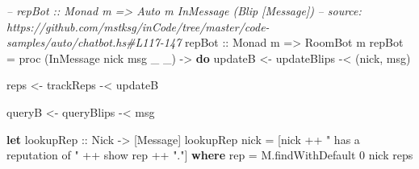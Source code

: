 \documentclass[]{article}
\newenvironment{Shaded}{\begin{snugshade}}{\end{snugshade}}
\newcommand{\CommentTok}[1]{\textcolor[rgb]{0.56,0.35,0.01}{\textit{#1}}}
\newcommand{\DataTypeTok}[1]{\textcolor[rgb]{0.13,0.29,0.53}{#1}}
\newcommand{\DecValTok}[1]{\textcolor[rgb]{0.00,0.00,0.81}{#1}}
\newcommand{\FunctionTok}[1]{\textcolor[rgb]{0.00,0.00,0.00}{#1}}
\newcommand{\KeywordTok}[1]{\textcolor[rgb]{0.13,0.29,0.53}{\textbf{#1}}}
\newcommand{\NormalTok}[1]{#1}
\newcommand{\OtherTok}[1]{\textcolor[rgb]{0.56,0.35,0.01}{#1}}
\newcommand{\StringTok}[1]{\textcolor[rgb]{0.31,0.60,0.02}{#1}}
\begin{document}
\begin{Shaded}
\begin{Highlighting}[]
\CommentTok{-- repBot :: Monad m => Auto m InMessage (Blip [Message])}
\CommentTok{-- source: https://github.com/mstksg/inCode/tree/master/code-samples/auto/chatbot.hs#L117-147}
\OtherTok{repBot ::} \DataTypeTok{Monad}\NormalTok{ m }\OtherTok{=>} \DataTypeTok{RoomBot}\NormalTok{ m}
\NormalTok{repBot }\FunctionTok{=}\NormalTok{ proc (}\DataTypeTok{InMessage}\NormalTok{ nick msg _ _) }\OtherTok{->} \KeywordTok{do}
\NormalTok{    updateB }\OtherTok{<-}\NormalTok{ updateBlips }\FunctionTok{-<}\NormalTok{ (nick, msg)}

\NormalTok{    reps    }\OtherTok{<-}\NormalTok{ trackReps   }\FunctionTok{-<}\NormalTok{ updateB}

\NormalTok{    queryB  }\OtherTok{<-}\NormalTok{ queryBlips  }\FunctionTok{-<}\NormalTok{ msg}

    \KeywordTok{let}\OtherTok{ lookupRep ::} \DataTypeTok{Nick} \OtherTok{->}\NormalTok{ [}\DataTypeTok{Message}\NormalTok{]}
\NormalTok{        lookupRep nick }\FunctionTok{=}\NormalTok{ [nick }\FunctionTok{++} \StringTok{" has a reputation of "} \FunctionTok{++}\NormalTok{ show rep }\FunctionTok{++} \StringTok{"."}\NormalTok{]}
          \KeywordTok{where}
\NormalTok{            rep }\FunctionTok{=}\NormalTok{ M.findWithDefault }\DecValTok{0}\NormalTok{ nick reps}


\end{Highlighting}
\end{Shaded}
\end{document}
